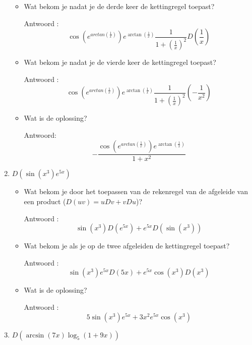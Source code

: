 \begin{enumerate}
\begin{itemize}
		\item Wat bekom je nadat je de derde keer de kettingregel toepast?
		
		Antwoord : \[\cos \left(  e^{arctan \left(  \frac{1}{x}  \right) } \right) e^{\arctan \left(  \frac{1}{x}  \right) }\frac{1}{1+\left( \frac{1}{x}  \right)^2}D\left( \frac{1}{x}  \right)\]
		
		\item Wat bekom je nadat je de vierde keer de kettingregel toepast?
		
		Antwoord :  \[\cos \left(  e^{arctan \left(  \frac{1}{x}  \right) } \right) e^{\arctan \left(  \frac{1}{x}  \right) }\frac{1}{1+\left( \frac{1}{x}  \right)^2}\left( -\frac{1}{x^2}  \right)\]
		
		\item Wat is de oplossing?
		
		Antwoord: \[-\frac{ \cos \left(  e^{arctan \left(  \frac{1}{x}  \right) } \right)  e^{\arctan \left(  \frac{1}{x}  \right) }  }{ 1+x^2  }\]
		
	\end{itemize}
	
	\item $D \left(  \sin \left( x^3  \right) e^{5x}  \right)$
	
	\begin{itemize}
		
		\item Wat bekom je door het toepassen van de rekenregel van de afgeleide van een product ($D(uv)=uDv+vDu$)?
		
		Antwoord : \[\sin \left( x^3  \right)D\left( e^{5x}  \right)+e^{5x}D\left(  \sin \left(  x^3 \right)  \right)\]
		
		\item Wat bekom je als je op de twee afgeleiden de kettingregel toepast?
		
		Antwoord : \[\sin \left( x^3  \right)e^{5x}D(5x)+e^{5x}\cos \left(  x^3 \right)D \left( x^3 \right)\]
		
		\item Wat is de oplossing?
		
		Antwoord : \[5\sin \left( x^3  \right)e^{5x}+3x^2e^{5x}\cos \left(  x^3 \right)\]
		
	\end{itemize}
	
	\item $D \left( \arcsin (7x)\log_5 (1+9x)   \right)$
	
	\begin{itemize}
		

\end{itemize}
\end{enumerate}
